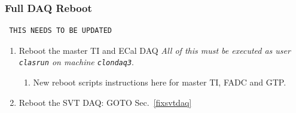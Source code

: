 \documentclass[12pt]{article}
\begin{document}
\subsubsection{Full DAQ Reboot}
\label{fixdaqbig}

\begin{verbatim} THIS NEEDS TO BE UPDATED \end{verbatim}


\begin{enumerate}

\item Reboot the master TI and ECal DAQ \newline
{\em All of this must be executed as user \texttt{clasrun} on machine \texttt{clondaq3}}.

\begin{enumerate}
\item 
New reboot scripts instructions here for master TI, FADC and GTP.
\end{enumerate}

\item Reboot the SVT DAQ: GOTO Sec.~\ref{fixsvtdaq}



\end{enumerate}

%
%
\end{document}
